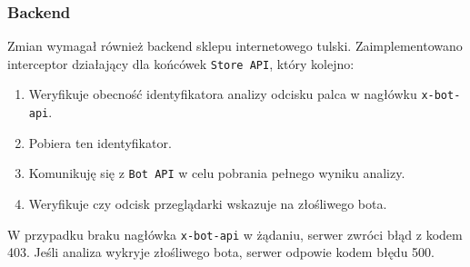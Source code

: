 \subsubsection{Backend}

Zmian wymagał również backend sklepu internetowego tulski.
Zaimplementowano interceptor działający dla końcówek \texttt{Store API}, który kolejno:
\begin{enumerate}
    \item Weryfikuje obecność identyfikatora analizy odcisku palca w nagłówku \texttt{x-bot-api}.
    \item Pobiera ten identyfikator.
    \item Komunikuję się z \texttt{Bot API} w celu pobrania pełnego wyniku analizy.
    \item Weryfikuje czy odcisk przeglądarki wskazuje na złośliwego bota.
\end{enumerate}
W przypadku braku nagłówka \texttt{x-bot-api} w żądaniu, serwer zwróci błąd z kodem 403.
Jeśli analiza wykryje złośliwego bota, serwer odpowie kodem błędu 500.
